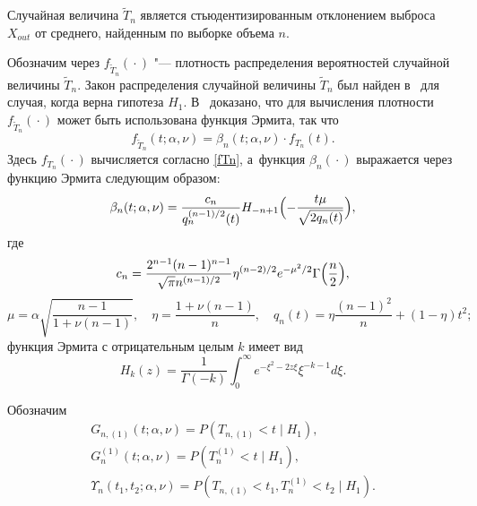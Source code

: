 Случайная величина  $\widetilde{T}_{n}$ является стьюдентизированным
отклонением выброса $X_{out}$ от среднего, найденным по выборке
объема $n$.

Обозначим  через $f_{\widetilde{T}_n}({}\cdot{})$ "--- плотность распределения вероятностей
случайной величины $\widetilde{T}_{n}$. 
Закон распределения случайной величины $\widetilde{T}_n$ был найден в~\cite{SibJim2010} для случая, когда
верна гипотеза $H_1$. 
В~\cite{Samgtu2012} доказано, что для вычисления плотности $f_{\widetilde{T}_n}({}\cdot{})$ может быть  использована  функция Эрмита, так что
\begin{equation}
\label{density}
f_{\widetilde{T}_n}(t;\alpha,\nu)= \beta_n(t;\alpha,\nu)\cdot f_{T_n}(t).
\end{equation}
Здесь  $f_{T_n}({}\cdot{})$ вычисляется согласно \eqref{fTn}, а~функция  $\beta_n({}\cdot{})$ выражается через функцию Эрмита следующим образом:
\begin{equation}
\label{beta}
\beta_n(t;\alpha,\nu)=\frac{c_n}{q_n^{({n-1})/{2}}(t)} H_{-n+1} \Bigl(-\frac{t\mu}{\sqrt{2q_n(t)}}\Bigr),
\end{equation}
где 
$$
c_n=\frac{2^{n-1}(n-1)^{n-1}}{\sqrt{\pi}n^{({n-1})/{2}}} \eta^{({n-2})/{2}}  e^{-{\mu^2}/{2}}
\Gamma\Bigl(\frac{n}{2}\Bigr),
$$
$$
\mu=\alpha\sqrt{\frac{n-1}{1+\nu(n-1)}},\quad \eta=\frac{1+\nu(n-1)}{n},
\quad q_n(t)= \eta\frac{(n-1)^2}{n}+(1-\eta)t^2;$$
функция Эрмита с отрицательным целым $k$ имеет вид
\begin{equation}
\label{Hermit} H_{k}(z)=\frac{1}{\Gamma(-k)}\int _0^{\infty}e^{-\xi^2-2z\xi}\xi^{-k-1}d\xi.
\end{equation}

Обозначим
\begin{gather*}
\label{Gniz}
G_{n,(1)}(t;\alpha,\nu)=P(T_{n,(1)}<t \mid H_1),
\\
\label{Gver}
G_{n}^{(1)}(t;\alpha,\nu)=P(T_{n}^{(1)}<t \mid H_1),
\\
\label{Upsilon}
\Upsilon_{n}(t_1,t_2;\alpha,\nu)=P(T_{n,(1)}<t_1, T_{n}^{(1)}<t_2 \mid H_1).
\end{gather*}

